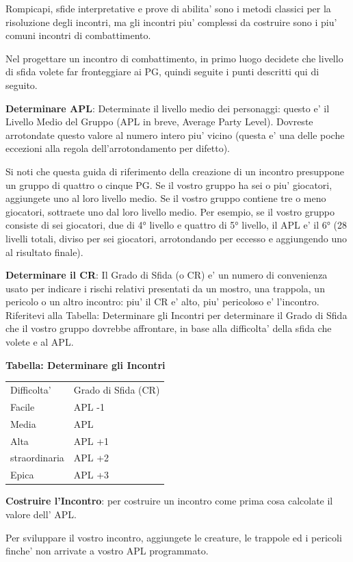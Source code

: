 \documentclass[a4paper,11pt,twoside,openany]{dndbook}
\begin{document}
{Rompicapi, sfide interpretative e prove di abilita' sono i metodi classici per la risoluzione degli incontri, ma gli incontri piu' complessi da costruire sono i piu' comuni incontri di combattimento.

Nel progettare un incontro di combattimento, in primo luogo decidete che livello di sfida volete far fronteggiare ai PG, quindi seguite i punti descritti qui di seguito.

\textbf{Determinare APL}: Determinate il livello medio dei personaggi: questo e' il Livello Medio del Gruppo (APL in breve, Average Party Level). Dovreste arrotondate questo valore al numero intero piu' vicino (questa e' una delle poche eccezioni alla regola dell'arrotondamento per difetto).

Si noti che questa guida di riferimento della creazione di un incontro presuppone un gruppo di quattro o cinque PG. Se il vostro gruppo ha sei o piu' giocatori, aggiungete uno al loro livello medio. Se il vostro gruppo contiene tre o meno giocatori, sottraete uno dal loro livello medio. Per esempio, se il vostro gruppo consiste di sei giocatori, due di 4° livello e quattro di 5° livello, il APL e' il 6° (28 livelli totali, diviso per sei giocatori, arrotondando per eccesso e aggiungendo uno al risultato finale).

\textbf{Determinare il CR}: Il Grado di Sfida (o CR) e' un numero di convenienza usato per indicare i rischi relativi presentati da un mostro, una trappola, un pericolo o un altro incontro: piu' il CR e' alto, piu' pericoloso e' l'incontro. Riferitevi alla Tabella: Determinare gli Incontri per determinare il Grado di Sfida che il vostro gruppo dovrebbe affrontare, in base alla difficolta' della sfida che volete e al APL.

\bigskip

\textbf{Tabella: Determinare gli Incontri}

\begin{tabular}[c]{@{}ll@{}}
\toprule 
Difficolta' & Grado di Sfida (CR)\tabularnewline
Facile & APL -1\tabularnewline
Media & APL\tabularnewline
Alta & APL +1\tabularnewline
straordinaria & APL +2\tabularnewline
Epica & APL +3\tabularnewline
\bottomrule
\end{tabular}

\bigskip

\textbf{Costruire l'Incontro}: per costruire un incontro come prima cosa calcolate il valore dell' APL.

Per sviluppare il vostro incontro, aggiungete le creature, le trappole ed i pericoli finche' non arrivate a vostro APL programmato.

}
\end{document}
